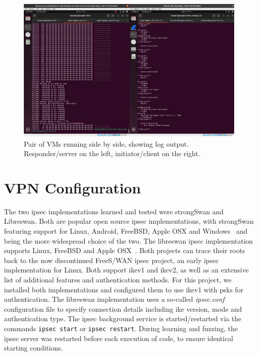 \begin{figure}
	\centering
	\includegraphics[width=\linewidth]{images/VM_setup}
	\caption{Pair of VMs running side by side, showing log output. \\Responder/server on the left, initiator/client on the right.}
	\label{fig:vmsetup}
\end{figure}


\section{VPN Configuration} \label{sec:vpn_setup}
The two \ac{ipsec} implementations learned and tested were strongSwan and Libreswan. Both are popular open source \ac{ipsec} implementations, with strongSwan featuring support for Linux, Android, FreeBSD, Apple OSX and Windows~\cite{doc:strongswan} and being the more widespread choice of the two. The libreswan \ac{ipsec} implementation supports Linux, FreeBSD and Apple OSX~\cite{doc:libreswan}. Both projects can trace their roots back to the now discontinued FreeS/WAN \ac{ipsec} project, an early \ac{ipsec} implementation for Linux. Both support \ac{ike}v1 and \ac{ike}v2, as well as an extensive list of additional features and authentication methods. For this project, we installed both implementations and configured them to use \ac{ike}v1 with \acp{psk} for authentication. The libreswan implementation uses a so-called \emph{ipsec.conf} configuration file to specify connection details including \ac{ike} version, mode and authentication type. The \ac{ipsec} background service is started/restarted via the commands \texttt{ipsec start} or \texttt{ipsec restart}. During learning and fuzzing, the \ac{ipsec} server was restarted before each execution of code, to ensure identical starting conditions.

